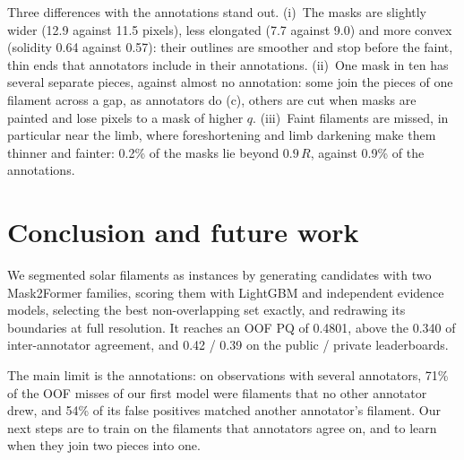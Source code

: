 \documentclass[sigconf]{acmart}
\begin{document}
{Three differences with the annotations stand out. (i)~The masks are slightly wider (12.9 against 11.5 pixels), less elongated (7.7 against 9.0) and more convex (solidity 0.64 against 0.57): their outlines are smoother and stop before the faint, thin ends that annotators include in their annotations. (ii)~One mask in ten has several separate pieces, against almost no annotation: some join the pieces of one filament across a gap, as annotators do (c), others are cut when masks are painted and lose pixels to a mask of higher $q$. (iii)~Faint filaments are missed, in particular near the limb, where foreshortening and limb darkening make them thinner and fainter: 0.2\% of the masks lie beyond $0.9\,R$, against 0.9\% of the annotations.



\section{Conclusion and future work}\label{sec:conclusion}
We segmented solar filaments as instances by generating candidates with two Mask2Former families, scoring them with LightGBM and independent evidence models, selecting the best non-overlapping set exactly, and redrawing its boundaries at full resolution. It reaches an OOF PQ of 0.4801, above the 0.340 of inter-annotator agreement, and 0.42 / 0.39 on the public / private leaderboards.

The main limit is the annotations: on observations with several annotators, 71\% of the OOF misses of our first model were filaments that no other annotator drew, and 54\% of its false positives matched another annotator's filament. Our next steps are to train on the filaments that annotators agree on, and to learn when they join two pieces into one.}
\end{document}
